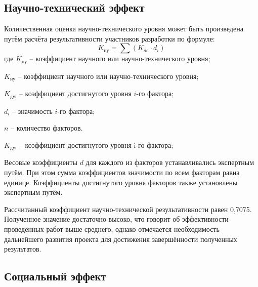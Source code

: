 \subsection{Научно-технический эффект}
Количественная оценка научно-технического уровня может быть произведена путём расчёта результативности участников разработки по формуле:
\begin{equation}
K_{\text{ну}}=\sum (K_{de} \cdot d_i)
\end{equation}
где $K_\text{ну}$ – коэффициент научного или научно-технического уровня;

$K_\text{ну}$ – коэффициент научного или научно-технического уровня;

$K_\text{дуi}$ – коэффициент достигнутого уровня $i$-го фактора;

$d_i$ – значимость $i$-го фактора;

$n$ – количество факторов.

$K_\text{дуi}$ – коэффициент достигнутого уровня $\text{i}$-го фактора;

Весовые коэффициенты $d$ для каждого из факторов устанавливались экспертным путём. При этом сумма коэффициентов значимости по всем факторам равна единице. Коэффициенты достигнутого уровня факторов также установлены экспертным путём.

Рассчитанный коэффициент научно-технической результативности равен 0,7075. Полученное значение достаточно высоко, что говорит об эффективности проведённых работ выше среднего, однако отмечается необходимость дальнейшего развития проекта для достижения завершённости полученных результатов.

\subsection{Социальный эффект}